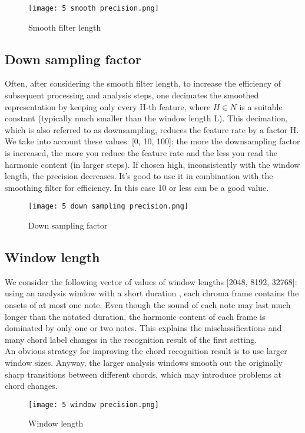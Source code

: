 \documentclass{article}
\begin{document}
\begin{figure}[H]
 \centering
 \texttt{[image: 5 smooth precision.png]}
 \caption{Smooth filter length}
\end{figure}

\subsection*{Down sampling factor}

Often, after considering the smooth filter length, to increase the efficiency of subsequent processing and analysis steps, one decimates the smoothed representation by keeping only every H-th feature, where  \(H \in N\) is a suitable constant (typically much smaller than the window length L). This decimation, which is also referred to as downsampling, reduces the feature rate by a factor H.\\
We take into account these values: [0, 10, 100]: the more the downsampling factor is increased, the more you reduce the feature rate and the less you read the harmonic content (in larger steps). If chosen high, inconsistently with the window length, the precision decreases.
It's good to use it in combination with the smoothing filter for efficiency. In this case 10 or less can be a good value. 

\begin{figure}[H]
 \centering
 \texttt{[image: 5 down sampling precision.png]}
 \caption{Down sampling factor}
\end{figure}

\subsection*{Window length}

We consider the following vector of values of window lengths [2048, 8192, 32768]:  using an analysis window with a short duration , each chroma frame contains the onsets of at most one note. Even though the sound of each note may last much longer than the notated duration, the harmonic content of each frame is dominated by only one or two notes. This explains the misclassifications and many chord label changes in the recognition result of the first setting. \\
An obvious strategy for improving the chord recognition result is to use larger window sizes. Anyway, the larger analysis windows smooth out the originally sharp transitions between different chords, which may introduce problems at chord changes.\\

\begin{figure}[H]
 \centering
 \texttt{[image: 5 window precision.png]}
 \caption{Window length}
\end{figure}

\end{document}
